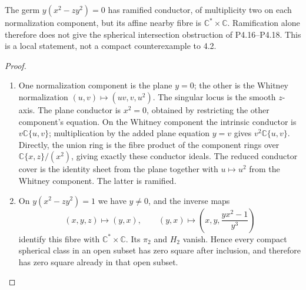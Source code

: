 \begin{proposition}[P4.19]\hypertarget{tag-02WQ}{}\label{night:P4.19}\label{stmt:P4.19}

The germ $y(x^2-zy^2)=0$ has ramified conductor, of multiplicity
two on each normalization component, but its affine nearby
fibre is $\mathbb C^*\times\mathbb C$. Ramification alone
therefore does not give the spherical intersection obstruction
of P4.16--P4.18. This is a local statement, not a compact
counterexample to 4.2.
\end{proposition}
\begin{proof}

\begin{enumerate}[label={$\langle1\rangle$\arabic*.},leftmargin=*]
\item One normalization component is the plane $y=0$; the other is
the Whitney normalization $(u,v)\mapsto(uv,v,u^2)$.
The singular locus is the smooth $z$-axis. The plane conductor
is $x^2=0$, obtained by restricting the other component's
equation. On the Whitney component the intrinsic conductor
is $v\mathbb C\{u,v\}$; multiplication by the added plane
equation $y=v$ gives $v^2\mathbb C\{u,v\}$. Directly, the
union ring is the fibre product of the component rings over
$\mathbb C\{x,z\}/(x^2)$, giving exactly these conductor ideals.
The reduced conductor cover is the identity sheet from the
plane together with $u\mapsto u^2$ from the Whitney component.
The latter is ramified.

\item On $y(x^2-zy^2)=1$ we have $y\ne0$, and the inverse maps
\[
 (x,y,z)\longmapsto(y,x),\qquad
 (y,x)\longmapsto\left(x,y,\frac{yx^2-1}{y^3}\right)
\]
identify this fibre with $\mathbb C^*\times\mathbb C$.
Its $\pi_2$ and $H_2$ vanish. Hence every compact spherical
class in an open subset has zero square after inclusion,
and therefore has zero square already in that open subset.

\end{enumerate}
\end{proof}